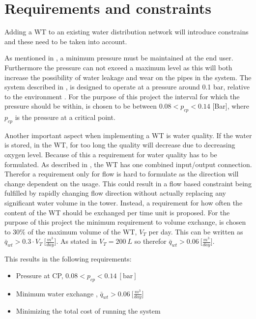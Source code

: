 \chapter{Requirements and constraints}
\label{Requirements_and_constraints}

Adding a WT to an existing water distribution network will introduce constrains and these need to be taken into account. 

As mentioned in , a minimum pressure must be maintained at the end user. Furthermore the pressure can not exceed a maximum level as this will both increase the possibility of water leakage and wear on the pipes in the system. The system described in , is designed to operate at a pressure around 0.1 bar, relative to the environment \cite{master_aau}. For the purpose of this project the interval for which the pressure should be within, is chosen to be between $0.08 < p_{cp} < 0.14$ [Bar], where $p_{cp}$ is the pressure at a critical point.

Another important aspect when implementing a WT is water quality. If the water is stored, in the WT, for too long the quality will decrease due to decreasing oxygen level. Because of this a requirement for water quality has to be formulated. As described in , the WT has one combined input/output connection. Therefor a requirement only for flow is hard to formulate as the direction will change dependent on the usage. This could result in a flow based constraint being fulfilled by rapidly changing flow direction without actually replacing any significant water volume in the tower. Instead, a requirement for how often the content of the WT should be exchanged per time unit is proposed. For the purpose of this project the minimum requirement to volume exchange, is chosen to 30\% of the maximum volume of the WT, $V_T$ per day. This can be written as $\bar{q}_{wt} > 0.3\cdot V_T \: \big[\frac{m^3}{day}\big]$. As stated in  $V_T = 200 \:L$ so therefor $\bar{q}_{wt} > 0.06 \: \big[\frac{m^3}{day}\big]$.

This results in the following requirements:

\begin{itemize}
	\item Pressure at CP, $0.08 < p_{cp} < 0.14 \:[\text{bar}]$
%
	\item Minimum water exchange , $\bar{q}_{wt} > 0.06 \: \big[\frac{m^3}{day}\big]$
%
	\item Minimizing the total cost of running the system
\end{itemize}